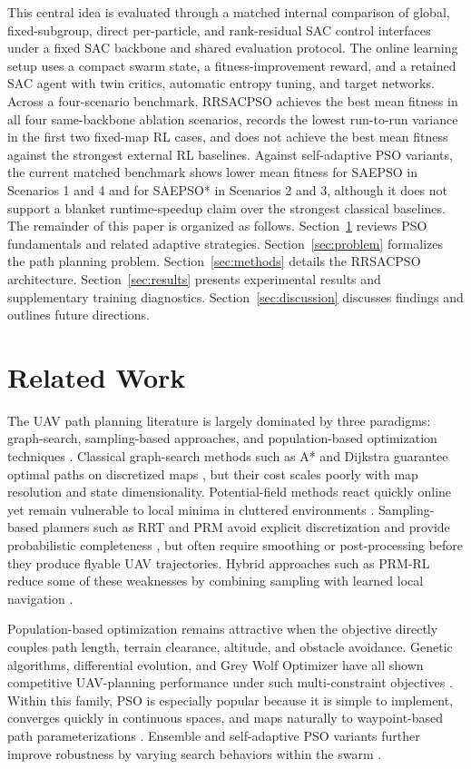 \documentclass[final,5p,times]{elsarticle}
\begin{document}
This central idea is evaluated through a matched internal comparison of global, fixed-subgroup, direct per-particle, and rank-residual SAC control interfaces under a fixed SAC backbone and shared evaluation protocol.
The online learning setup uses a compact swarm state, a fitness-improvement reward, and a retained SAC agent with twin critics, automatic entropy tuning, and target networks.
Across a four-scenario benchmark, RRSACPSO achieves the best mean fitness in all four same-backbone ablation scenarios, records the lowest run-to-run variance in the first two fixed-map RL cases, and does not achieve the best mean fitness against the strongest external RL baselines.
Against self-adaptive PSO variants, the current matched benchmark shows lower mean fitness for SAEPSO in Scenarios 1 and 4 and for SAEPSO* in Scenarios 2 and 3, although it does not support a blanket runtime-speedup claim over the strongest classical baselines.
The remainder of this paper is organized as follows.
Section~\ref{sec:background} reviews PSO fundamentals and related adaptive strategies.
Section~\ref{sec:problem} formalizes the path planning problem.
Section~\ref{sec:methods} details the RRSACPSO architecture.
Section~\ref{sec:results} presents experimental results and supplementary training diagnostics.
Section~\ref{sec:discussion} discusses findings and outlines future directions.
\section{Related Work}
\label{sec:background} 
The UAV path planning literature is largely dominated by three paradigms: graph-search, sampling-based approaches, and population-based optimization techniques \cite{AitSaadi2022UAV, Zhou2025A}.
Classical graph-search methods such as A* and Dijkstra guarantee optimal paths on discretized maps \cite{Hart1968A}, but their cost scales poorly with map resolution and state dimensionality.
Potential-field methods react quickly online yet remain vulnerable to local minima in cluttered environments \cite{Mac2016Heuristic}.
Sampling-based planners such as RRT and PRM avoid explicit discretization and provide probabilistic completeness \cite{Karur2021A}, but often require smoothing or post-processing before they produce flyable UAV trajectories.
Hybrid approaches such as PRM-RL reduce some of these weaknesses by combining sampling with learned local navigation \cite{Faust2017PRMRL}.

Population-based optimization remains attractive when the objective directly couples path length, terrain clearance, altitude, and obstacle avoidance.
Genetic algorithms, differential evolution, and Grey Wolf Optimizer have all shown competitive UAV-planning performance under such multi-constraint objectives \cite{Debnath2024An, AitSaadi2022UAV}.
Within this family, PSO is especially popular because it is simple to implement, converges quickly in continuous spaces, and maps naturally to waypoint-based path parameterizations \cite{Cheng2024Research, Phung2021Safetyenhanced}.
Ensemble and self-adaptive PSO variants further improve robustness by varying search behaviors within the swarm \cite{Lynn2017Ensemble}.
\end{document}
